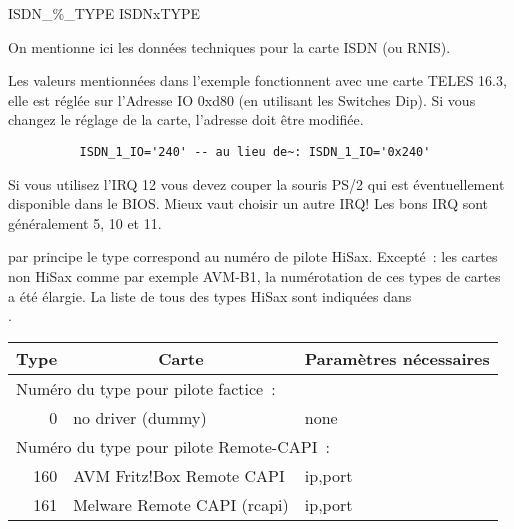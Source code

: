 \begin{description}
 {ISDN\_\%\_TYPE} {ISDNxTYPE}

  On mentionne ici les données techniques pour la carte ISDN (ou RNIS).

  Les valeurs mentionnées dans l'exemple fonctionnent avec une carte
  TELES 16.3, elle est réglée sur l'Adresse IO 0xd80 (en utilisant les Switches Dip).
  Si vous changez le réglage de la carte, l'adresse doit être modifiée.

  \begin{example}
  \begin{verbatim}
          ISDN_1_IO='240' -- au lieu de~: ISDN_1_IO='0x240'
  \end{verbatim}
  \end{example}

  Si vous utilisez l'IRQ 12 vous devez couper la souris PS/2 qui
  est éventuellement disponible dans le BIOS. Mieux vaut choisir
  un autre IRQ! \flqq{}Les bons\frqq{} IRQ sont généralement 5, 10 et 11.

   par principe le type correspond au numéro de
  pilote HiSax. Excepté~: les cartes non HiSax comme par exemple AVM-B1,
  la numérotation de ces types de cartes a été élargie. La liste de tous
  des types HiSax sont indiquées dans \\
  .

\begin{small}
  \begin{longtable}{|r|p{60mm}|p{62mm}|}
    \hline
    \multicolumn{1}{|c}{\textbf{Type}} & \multicolumn{1}{|c}{\textbf{Carte}} &
    \multicolumn{1}{|c|}{\textbf{Paramètres nécessaires}} \\
    \hline\hline
    \endhead

    \multicolumn{3}{|l|}{Numéro du type pour pilote factice~:} \\
    \hline
      0 &  no driver (dummy)             & none \\

    \hline\hline
    \multicolumn{3}{|l|}{Numéro du type pour pilote Remote-CAPI~:} \\
    \hline

    160 & AVM Fritz!Box Remote CAPI   & ip,port \\
    161 & Melware Remote CAPI (rcapi) & ip,port \\


\end{longtable}
\end{small}
\end{description}
